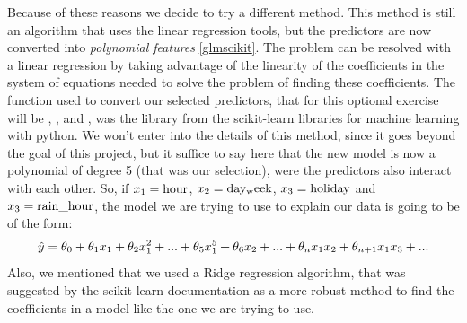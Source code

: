\documentclass[a4paper,12pt,english]{sphinxmanual}
\begin{document}
Because of these reasons we decide to try a different method. This method is still
an algorithm that uses the linear regression tools, but the predictors are now
converted into \emph{polynomial features} {\hyperref[overview:glmscikit]{{[}glmscikit{]}}}. The problem can be resolved with
a linear regression by taking advantage of the linearity of the coefficients in
the system of equations needed to solve the problem of finding these coefficients.
The function used to convert our selected predictors, that for this optional exercise
will be , ,  and , was the library
 from the scikit-learn libraries for machine learning with
python. We won't enter into the details of this method, since it goes beyond
the goal of this project, but it suffice to say here that the new model is now
a polynomial of degree 5 (that was our selection), were the predictors also interact
with each other. So, if \(x_1 = \rm{hour}\), \(x_2 = \rm{day_week}\),
\(x_3 = \rm{holiday}\) and \(x_3 = \rm{rain\_hour}\), the model we are
trying to use to explain our data is going to be of the form:
\begin{gather}
\begin{split}\hat{y} = \theta_0 + \theta_1 x_1 + \theta_2 x_1^2 + ... + \theta_5 x_1^5 +
\theta_6 x_2 +...+ \theta_n x_1 x_2 + \theta_{n+1} x_1 x_3 + ...\end{split}\notag
\end{gather}
Also, we mentioned that we used a Ridge regression algorithm, that was suggested
by the scikit-learn documentation as a more robust method to find the coefficients
in a model like the one we are trying to use.
\end{document}
